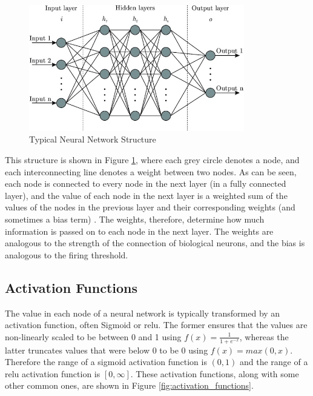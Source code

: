 \begin{figure}[h]
    \centering
    \includegraphics[height=5.5cm] {paper/images/neural_network_structure.jpeg} %
    \caption{Typical Neural Network Structure \citep{Shukla}}
    \label{fig:neural_network_structure}
\end{figure}

This structure is shown in Figure \ref{fig:neural_network_structure}, where each grey circle denotes a node, and each interconnecting line denotes a weight between two nodes. As can be seen, each node is connected to every node in the next layer (in a fully connected layer), and the value of each node in the next layer is a weighted sum of the values of the nodes in the previous layer and their corresponding weights (and sometimes a bias term) \citep{Bishop}. The weights, therefore, determine how much information is passed on to each node in the next layer. The weights are analogous to the strength of the connection of biological neurons, and the bias is analogous to the firing threshold.

\subsection{Activation Functions}\label{sec:background_anns_activation_functions}
The value in each node of a neural network is typically transformed by an activation function, often Sigmoid or \acrfull{relu}. The former ensures that the values are non-linearly scaled to be between 0 and 1 using $f(x) = \frac{1}{1+e^{-x}}$, whereas the latter truncates values that were below 0 to be 0 using $f(x) = max(0, x)$. Therefore the range of a sigmoid activation function is $(0, 1)$ and the range of a \acrshort{relu} activation function is $[0, \infty]$. These activation functions, along with some other common ones, are shown in Figure \ref{fig:activation_functions}.

